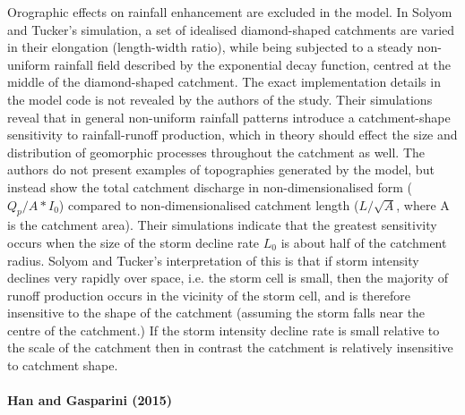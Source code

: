 Orographic effects on rainfall enhancement are excluded in the model. In Solyom and Tucker's simulation, a set of idealised diamond-shaped catchments are varied in their elongation (length-width ratio), while being subjected to a steady non-uniform rainfall field described by the exponential decay function, centred at the middle of the diamond-shaped catchment. The exact implementation details in the model code is not revealed by the authors of the study. Their simulations reveal that in general non-uniform rainfall patterns introduce a catchment-shape sensitivity to rainfall-runoff production, which in theory should effect the size and distribution of geomorphic processes throughout the catchment as well. The authors do not present examples of topographies generated by the model, but instead show the total catchment discharge in non-dimensionalised form (\(Q_p/A*I_0\)) compared to non-dimensionalised catchment length (\(L/\sqrt{A}\), where A is the catchment area). Their simulations indicate that the greatest sensitivity occurs when the size of the storm decline rate \(L_0\) is about half of the catchment radius. Solyom and Tucker's interpretation of this is that if storm intensity declines very rapidly over space, i.e. the storm cell is small, then the majority of runoff production occurs in the vicinity of the storm cell, and is therefore insensitive to the shape of the catchment (assuming the storm falls near the centre of the catchment.) If the storm intensity decline rate is small relative to the scale of the catchment then in contrast the catchment is relatively insensitive to catchment shape.

\paragraph{Han and Gasparini (2015)}

